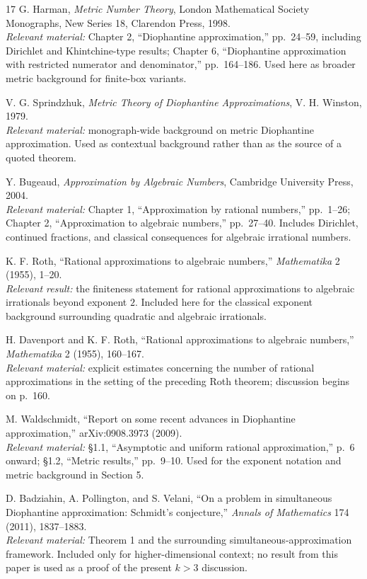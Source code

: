\documentclass[12pt]{article}
\begin{document}
\begin{thebibliography}{17}
G. Harman, \emph{Metric Number Theory}, London Mathematical Society Monographs, New Series 18, Clarendon Press, 1998.\\
\textit{Relevant material:} Chapter 2, ``Diophantine approximation,'' pp.~24--59, including Dirichlet and Khintchine-type results; Chapter 6, ``Diophantine approximation with restricted numerator and denominator,'' pp.~164--186. Used here as broader metric background for finite-box variants.

V. G. Sprindzhuk, \emph{Metric Theory of Diophantine Approximations}, V. H. Winston, 1979.\\
\textit{Relevant material:} monograph-wide background on metric Diophantine approximation. Used as contextual background rather than as the source of a quoted theorem.

Y. Bugeaud, \emph{Approximation by Algebraic Numbers}, Cambridge University Press, 2004.\\
\textit{Relevant material:} Chapter 1, ``Approximation by rational numbers,'' pp.~1--26; Chapter 2, ``Approximation to algebraic numbers,'' pp.~27--40. Includes Dirichlet, continued fractions, and classical consequences for algebraic irrational numbers.

K. F. Roth, ``Rational approximations to algebraic numbers,'' \emph{Mathematika} 2 (1955), 1--20.\\
\textit{Relevant result:} the finiteness statement for rational approximations to algebraic irrationals beyond exponent $2$. Included here for the classical exponent background surrounding quadratic and algebraic irrationals.

H. Davenport and K. F. Roth, ``Rational approximations to algebraic numbers,'' \emph{Mathematika} 2 (1955), 160--167.\\
\textit{Relevant material:} explicit estimates concerning the number of rational approximations in the setting of the preceding Roth theorem; discussion begins on p.~160.

M. Waldschmidt, ``Report on some recent advances in Diophantine approximation,'' arXiv:0908.3973 (2009).\\
\textit{Relevant material:} \S1.1, ``Asymptotic and uniform rational approximation,'' p.~6 onward; \S1.2, ``Metric results,'' pp.~9--10. Used for the exponent notation and metric background in Section 5.

D. Badziahin, A. Pollington, and S. Velani, ``On a problem in simultaneous Diophantine approximation: Schmidt's conjecture,'' \emph{Annals of Mathematics} 174 (2011), 1837--1883.\\
\textit{Relevant material:} Theorem 1 and the surrounding simultaneous-approximation framework. Included only for higher-dimensional context; no result from this paper is used as a proof of the present $k>3$ discussion.


\end{thebibliography}
\end{document}
